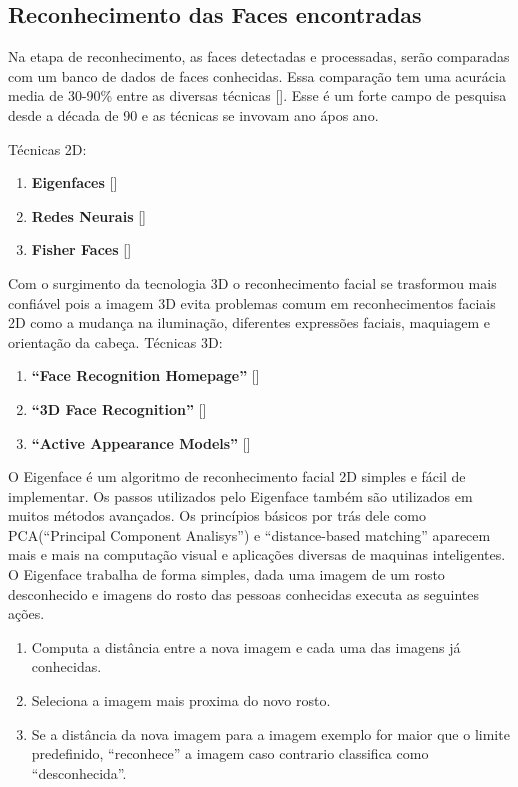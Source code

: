 \subsection{Reconhecimento das Faces encontradas}

Na etapa de reconhecimento, as faces detectadas e processadas, serão comparadas com um banco de dados de faces conhecidas. Essa comparação tem uma acurácia media de 30-90\% entre as diversas técnicas []. Esse é um forte campo de pesquisa desde a década de 90 e as técnicas se invovam ano ápos ano.

	Técnicas 2D:
	\begin{enumerate}
		\item \textbf{Eigenfaces} []
		\item \textbf{Redes Neurais} []
		\item \textbf{Fisher Faces} []
	\end{enumerate}

Com o surgimento da tecnologia 3D o reconhecimento facial se trasformou mais confiável pois a imagem 3D evita problemas comum em reconhecimentos faciais 2D como a mudança na iluminação, diferentes expressões faciais, maquiagem e orientação da cabeça.
	Técnicas 3D:
	\begin{enumerate}
		\item \textbf{``Face Recognition Homepage''} []
		\item \textbf{``3D Face Recognition''} []
		\item \textbf{``Active Appearance Models''} []
	\end{enumerate}


O Eigenface é um algoritmo de reconhecimento facial 2D simples e fácil de implementar. Os passos utilizados pelo Eigenface também são utilizados em muitos métodos avançados. Os princípios básicos por trás dele como PCA(``Principal Component Analisys'') e ``distance-based matching'' aparecem mais e mais na computação visual e aplicações diversas de maquinas inteligentes.
O Eigenface trabalha de forma simples, dada uma imagem de um rosto desconhecido e imagens do rosto das pessoas conhecidas executa as seguintes ações.
	\begin{enumerate}
		\item Computa a distância entre a nova imagem e cada uma das imagens já conhecidas.
		\item Seleciona a imagem mais proxima do novo rosto.
		\item Se a distância da nova imagem para a imagem exemplo for maior que o limite predefinido, ``reconhece'' a imagem caso contrario classifica como ``desconhecida''.
	\end{enumerate}


